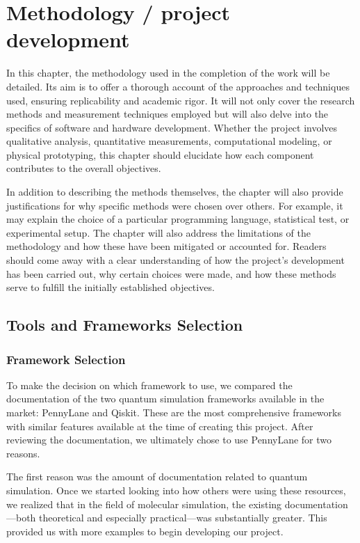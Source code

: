 

\chapter{Methodology / project development}

In this chapter, the methodology used in the completion of the work will be detailed. Its aim is to offer a thorough account of the approaches and techniques used, ensuring replicability and academic rigor. It will not only cover the research methods and measurement techniques employed but will also delve into the specifics of software and hardware development. Whether the project involves qualitative analysis, quantitative measurements, computational modeling, or physical prototyping, this chapter should elucidate how each component contributes to the overall objectives.

In addition to describing the methods themselves, the chapter will also provide justifications for why specific methods were chosen over others. For example, it may explain the choice of a particular programming language, statistical test, or experimental setup. The chapter will also address the limitations of the methodology and how these have been mitigated or accounted for. Readers should come away with a clear understanding of how the project's development has been carried out, why certain choices were made, and how these methods serve to fulfill the initially established objectives.

\section{Tools and Frameworks Selection} 
\subsection{Framework Selection}
To make the decision on which framework to use, we compared the documentation of the two quantum simulation frameworks available in the market: PennyLane and Qiskit. These are the most comprehensive frameworks with similar features available at the time of creating this project. After reviewing the documentation, we ultimately chose to use PennyLane for two reasons.

The first reason was the amount of documentation related to quantum simulation. Once we started looking into how others were using these resources, we realized that in the field of molecular simulation, the existing documentation—both theoretical and especially practical—was substantially greater. This provided us with more examples to begin developing our project.

